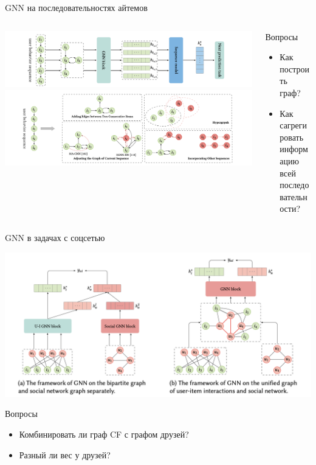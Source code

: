 \documentclass[11pt,aspectratio=169,handout]{beamer}
\begin{document}
\begin{frame}{GNN на последовательностях айтемов}

\begin{columns}
\begin{column}{0.5\textwidth}
\begin{center}
\includegraphics[scale=0.25]{images/gnn-seq.png}
\includegraphics[scale=0.25]{images/gnn-seq-graph.png}
\end{center}
\end{column}

\begin{column}{0.4\textwidth}
Вопросы
\begin{itemize}
\item Как построить граф?
\item Как сагрегировать информацию всей последовательности?
\end{itemize}
\end{column}

\end{columns}

\end{frame}

\begin{frame}{GNN в задачах с соцсетью}

\begin{center}
\includegraphics[scale=0.3]{images/gnn-social.png}
\end{center}

Вопросы
\begin{itemize}
\item Комбинировать ли граф CF с графом друзей?
\item Разный ли вес у друзей?
\end{itemize}

\end{frame}
\end{document}

